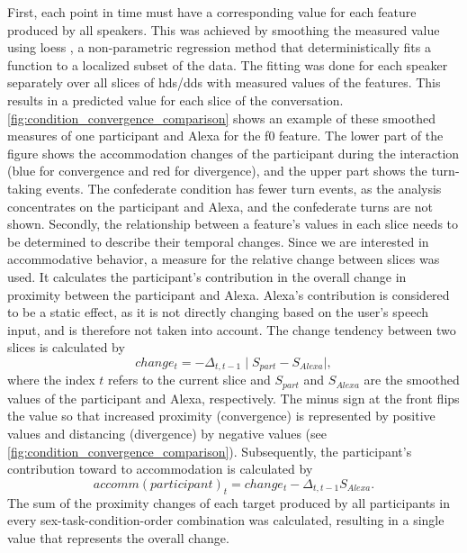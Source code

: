 First, each point in time must have a corresponding value for each feature produced by all speakers.
This was achieved by smoothing the measured value using \ac{loess} \citep{Cleveland1988locally}, a non-parametric regression method that deterministically fits a function to a localized subset of the data.
The fitting was done for each speaker separately over all slices of \ac{hds}/\ac{dds} with measured values of the features.
This results in a predicted value for each slice of the conversation.
\cref{fig:condition_convergence_comparison} shows an example of these smoothed measures of one participant and Alexa for the \ac{f0} feature.
The lower part of the figure shows the accommodation changes of the participant during the interaction (blue for convergence and red for divergence), and the upper part shows the turn-taking events.
The confederate condition has fewer turn events, as the analysis concentrates on the participant and Alexa, and the confederate turns are not shown.
Secondly, the relationship between a feature's values in each slice needs to be determined to describe their temporal changes.
Since we are interested in accommodative behavior, a measure for the relative change between slices was used.
It calculates the participant's contribution in the overall change in proximity between the participant and Alexa.
Alexa's contribution is considered to be a static effect, as it is not directly changing based on the user's speech input, and is therefore not taken into account.
The change tendency between two slices is calculated by
%
\begin{equation}
	\label{eq:change}
	change_t = -\Delta_{t, t-1} \mid S_{part} - S_{Alexa} \mid,
\end{equation}
\noindent
%
where the index $t$ refers to the current slice and $S_{part}$ and $S_{Alexa}$ are the smoothed values of the participant and Alexa, respectively.
The minus sign at the front flips the value so that increased proximity (convergence) is represented by positive values and distancing (divergence) by negative values (see \cref{fig:condition_convergence_comparison}).
Subsequently, the participant's contribution toward to accommodation is calculated by
%
\begin{equation}
	\label{eq:accommodation}
	accomm(participant)_t = change_t - \Delta_{t, t-1} S_{Alexa}.
\end{equation}
\noindent
%
The sum of the proximity changes of each target produced by all participants in every sex-task-condition-order combination was calculated, resulting in a single value that represents the overall change.
